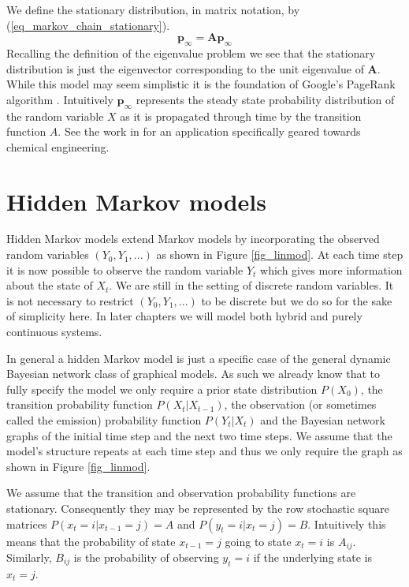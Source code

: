 We define the stationary distribution, in matrix notation, by (\ref{eq_markov_chain_stationary}).
\begin{equation}
\mathbf{p}_{\infty} = \mathbf{A}\mathbf{p}_{\infty}
\label{eq_markov_chain_stationary}
\end{equation}
Recalling the definition of the eigenvalue problem we see that the stationary distribution is just the eigenvector corresponding to the unit eigenvalue of $\mathbf{A}$. While this model may seem simplistic it is the foundation of Google's PageRank algorithm \cite{google}.  Intuitively $\mathbf{p}_\infty$ represents the steady state probability distribution of the random variable $X$ as it is propagated through time by the transition function $A$. See the work in \cite{streicher} for an application specifically geared towards chemical engineering.

\section{Hidden Markov models}
Hidden Markov models extend Markov models by incorporating the observed random variables $(Y_0, Y_1,...)$ as shown in Figure \ref{fig_linmod}. At each time step it is now possible to observe the random variable $Y_t$ which gives more information about the state of $X_t$. We are still in the setting of discrete random variables. It is not necessary to restrict $(Y_0, Y_1,...)$ to be discrete but we do so for the sake of simplicity here. In later chapters we will model both hybrid and purely continuous systems. 

In general a hidden Markov model is just a specific case of the general dynamic Bayesian network class of graphical models. As such we already know that to fully specify the model we only require a prior state distribution $P(X_0)$, the transition probability function $P(X_t|X_{t-1})$, the observation (or sometimes called the emission) probability function $P(Y_t|X_t)$ and the Bayesian network graphs of the initial time step and the next two time steps. We assume that the model's structure repeats at each time step and thus we only require the graph as shown in Figure \ref{fig_linmod}.

We assume that the transition and observation probability functions are stationary. Consequently they may be represented by the row stochastic square matrices $P(x_t=i|x_{t-1}=j) = A$ and $P(y_t=i|x_t=j) = B$. Intuitively this means that the probability of state $x_{t-1}=j$ going to state $x_{t} = i$ is $A_{ij}$. Similarly, $B_{ij}$ is the probability of observing $y_t=i$ if the underlying state is $x_t=j$.

